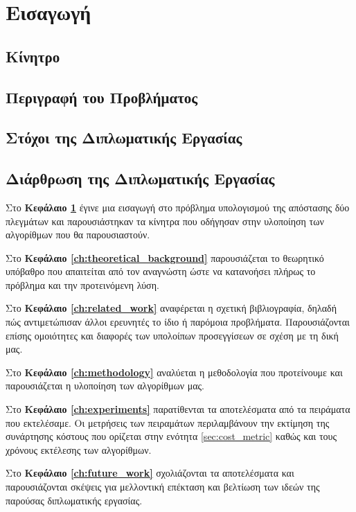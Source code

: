 \chapter{Εισαγωγή}
\label{ch:introduction}
\section{Κίνητρο}

\section{Περιγραφή του Προβλήματος}

\section{Στόχοι της Διπλωματικής Εργασίας}

\section{Διάρθρωση της Διπλωματικής Εργασίας}
Στο \textbf{Κεφάλαιο \ref{ch:introduction}} έγινε μια εισαγωγή στο 
πρόβλημα υπολογισμού της απόστασης δύο πλεγμάτων και παρουσιάστηκαν
τα κίνητρα που οδήγησαν στην υλοποίηση των αλγορίθμων που θα 
παρουσιαστούν. 

Στο \textbf{Κεφάλαιο \ref{ch:theoretical_background}} παρουσιάζεται το 
θεωρητικό υπόβαθρο που απαιτείται από τον αναγνώστη ώστε να κατανοήσει
πλήρως το πρόβλημα και την προτεινόμενη λύση.

Στο \textbf{Κεφάλαιο \ref{ch:related_work}} αναφέρεται η σχετική 
βιβλιογραφία, δηλαδή πώς αντιμετώπισαν άλλοι ερευνητές το ίδιο ή 
παρόμοια προβλήματα. 
Παρουσιάζονται επίσης ομοιότητες και διαφορές
των υπολοίπων προσεγγίσεων σε σχέση με τη δική μας.

Στο \textbf{Κεφάλαιο \ref{ch:methodology}} αναλύεται η μεθοδολογία 
που προτείνουμε και παρουσιάζεται η υλοποίηση των αλγορίθμων μας.

Στο \textbf{Κεφάλαιο \ref{ch:experiments}} παρατίθενται τα αποτελέσματα 
από τα πειράματα που εκτελέσαμε. 
Οι μετρήσεις των πειραμάτων περιλαμβάνουν την εκτίμηση της συνάρτησης 
κόστους που ορίζεται στην ενότητα \ref{sec:cost_metric} καθώς και τους χρόνους
εκτέλεσης των αλγορίθμων. 

Στο \textbf{Κεφάλαιο \ref{ch:future_work}} σχολιάζονται τα αποτελέσματα
και παρουσιάζονται σκέψεις για μελλοντική επέκταση και βελτίωση των 
ιδεών της παρούσας διπλωματικής εργασίας.
